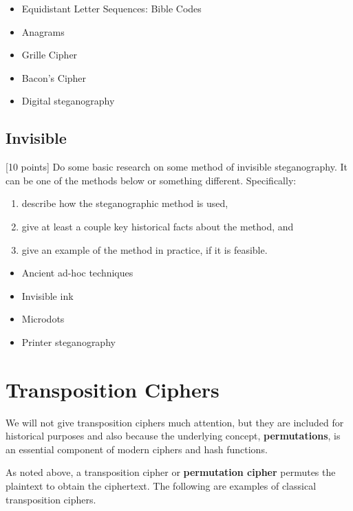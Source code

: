 \begin{itemize}
   \item{Equidistant Letter Sequences: Bible Codes}
   \item{Anagrams}
   \item{Grille Cipher}
   \item{Bacon's Cipher}
   \item{Digital steganography}
\end{itemize}

		\subsection{Invisible}

\begin{problem}
\label{prob-steg2} [10 points]
Do some basic research on some method of invisible steganography. It can be one of the methods below or something different. Specifically:
\begin{enumerate}
   \item describe how the steganographic method is used,
   \item give at least a couple key historical facts about the method, and
   \item give an example of the method in practice, if it is feasible.
\end{enumerate}
\end{problem}

                \begin{itemize}
				\item{Ancient ad-hoc techniques}
				\item{Invisible ink}
				\item{Microdots}
				\item{Printer steganography}
                \end{itemize}

	\section{Transposition Ciphers}
		We will not give transposition ciphers  much attention, but they are included for historical purposes and also because the underlying concept, {\bf permutations},  is an essential component of modern ciphers and hash functions. 

		As noted above, a transposition cipher  or {\bf permutation cipher}  permutes the plaintext to obtain the ciphertext. The following are examples of classical transposition ciphers.

